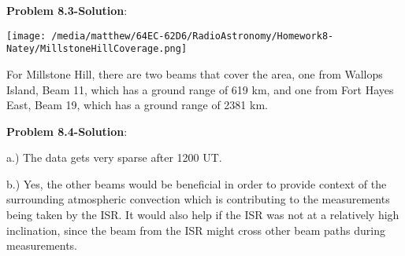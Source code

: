 \documentclass{article}
\begin{document}
\pagebreak
\textbf{Problem 8.3-Solution}:

\smallskip
\texttt{[image: /media/matthew/64EC-62D6/RadioAstronomy/Homework8-Natey/MillstoneHillCoverage.png]}

For Millstone Hill, there are two beams that cover the area, one from Wallops Island, Beam 11, which has a ground range of 619 km, and one from Fort Hayes East, Beam 19, which has a ground range of 2381 km.

\pagebreak
\textbf{Problem 8.4-Solution}:

a.) The data gets very sparse after 1200 UT.

\smallskip
b.) Yes, the other beams would be beneficial in order to provide context of the surrounding atmospheric convection which is contributing to the measurements being taken by the ISR.  It would also help if the ISR was not at a relatively high inclination, since the beam from the ISR might cross other beam paths during measurements.
\end{document}
